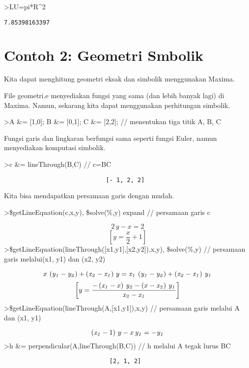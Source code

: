 \documentclass[
]{book}
\begin{document}
\textgreater LU=pi*R\^{}2

\begin{verbatim}
7.85398163397
\end{verbatim}

\chapter{Contoh 2: Geometri Smbolik}\label{contoh-2-geometri-smbolik}

Kita dapat menghitung geometri eksak dan simbolik menggunakan Maxima.

File geometri.e menyediakan fungsi yang sama (dan lebih banyak lagi) di Maxima. Namun, sekarang kita dapat menggunakan perhitungan simbolik.

\textgreater A \&= {[}1,0{]}; B \&= {[}0,1{]}; C \&= {[}2,2{]}; // menentukan tiga titik A, B, C

Fungsi garis dan lingkaran berfungsi sama seperti fungsi Euler, namun menyediakan komputasi simbolik.

\textgreater c \&= lineThrough(B,C) // c=BC

\begin{verbatim}
                             [- 1, 2, 2]
\end{verbatim}

Kita bisa mendapatkan persamaan garis dengan mudah.

\textgreater\$getLineEquation(c,x,y), \$solve(\%,y) \textbar{} expand // persamaan garis c

\[2\,y-x=2\]\[\left[ y=\frac{x}{2}+1 \right] \]\textgreater\$getLineEquation(lineThrough({[}x1,y1{]},{[}x2,y2{]}),x,y), \$solve(\%,y) // persamaan garis melalui(x1, y1) dan (x2, y2)

\[x\,\left({\it y_1}-{\it y_2}\right)+\left({\it x_2}-{\it x_1}
 \right)\,y={\it x_1}\,\left({\it y_1}-{\it y_2}\right)+\left(
 {\it x_2}-{\it x_1}\right)\,{\it y_1}\]\[\left[ y=\frac{-\left({\it x_1}-x\right)\,{\it y_2}-\left(x-
 {\it x_2}\right)\,{\it y_1}}{{\it x_2}-{\it x_1}} \right] \]\textgreater\$getLineEquation(lineThrough(A,{[}x1,y1{]}),x,y) // persamaan garis melalui A dan (x1, y1)

\[\left({\it x_1}-1\right)\,y-x\,{\it y_1}=-{\it y_1}\]\textgreater h \&= perpendicular(A,lineThrough(B,C)) // h melalui A tegak lurus BC

\begin{verbatim}
                              [2, 1, 2]
\end{verbatim}
\end{document}
